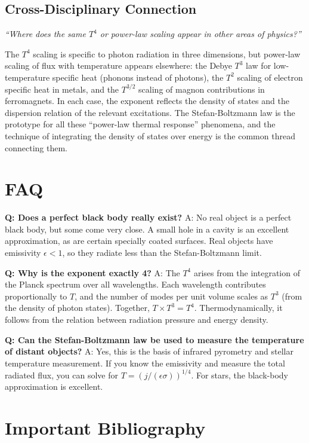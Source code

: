 \documentclass[11pt,openright]{book}
\begin{document}
\subsection*{Cross-Disciplinary Connection}
\textit{``Where does the same $T^4$ or power-law scaling appear in other areas of physics?''}

The $T^4$ scaling is specific to photon radiation in three dimensions, but power-law scaling of flux with temperature appears elsewhere: the Debye $T^3$ law for low-temperature specific heat (phonons instead of photons), the $T^2$ scaling of electron specific heat in metals, and the $T^{3/2}$ scaling of magnon contributions in ferromagnets. In each case, the exponent reflects the density of states and the dispersion relation of the relevant excitations. The Stefan-Boltzmann law is the prototype for all these ``power-law thermal response'' phenomena, and the technique of integrating the density of states over energy is the common thread connecting them.
\section*{FAQ}

\textbf{Q: Does a perfect black body really exist?}
A: No real object is a perfect black body, but some come very close. A small hole in a cavity is an excellent approximation, as are certain specially coated surfaces. Real objects have emissivity $\epsilon < 1$, so they radiate less than the Stefan-Boltzmann limit.

\textbf{Q: Why is the exponent exactly 4?}
A: The $T^4$ arises from the integration of the Planck spectrum over all wavelengths. Each wavelength contributes proportionally to $T$, and the number of modes per unit volume scales as $T^3$ (from the density of photon states). Together, $T \times T^3 = T^4$. Thermodynamically, it follows from the relation between radiation pressure and energy density.

\textbf{Q: Can the Stefan-Boltzmann law be used to measure the temperature of distant objects?}
A: Yes, this is the basis of infrared pyrometry and stellar temperature measurement. If you know the emissivity and measure the total radiated flux, you can solve for $T = (j/(\epsilon\sigma))^{1/4}$. For stars, the black-body approximation is excellent.
\section*{Important Bibliography}
\end{document}
